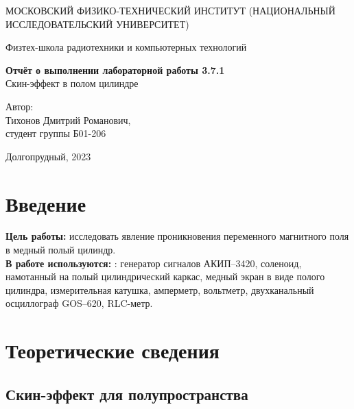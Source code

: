 \documentclass[a4paper, 12pt]{article}
\begin{document}
    \begin{titlepage}
	\begin{center}
            {\large МОСКОВСКИЙ ФИЗИКО-ТЕХНИЧЕСКИЙ ИНСТИТУТ (НАЦИОНАЛЬНЫЙ ИССЛЕДОВАТЕЛЬСКИЙ УНИВЕРСИТЕТ)}
	\end{center}
 
	\begin{center}
		{\large Физтех-школа радиотехники и компьютерных технологий}
	\end{center}
	
	\vspace{8cm}
	{\LARGE
		\begin{center}
                {\bf Отчёт о выполнении лабораторной работы 3.7.1}\\
                Скин-эффект в полом цилиндре
		\end{center}
	}
	\vspace{5cm}
	\begin{flushright}
		{\Large Автор:\\ Тихонов Дмитрий Романович, \\
			\vspace{0.2cm}
			студент группы Б01-206}
	\end{flushright}
	\vspace{5cm}
	\begin{center}
		\Large Долгопрудный, 2023
	\end{center}
    \end{titlepage}


    \section{Введение}

    \noindent \textbf{Цель работы:} исследовать явление проникновения переменного магнитного поля в медный полый цилиндр. \\

    \noindent \textbf{В работе используются:} : генератор сигналов АКИП–3420, соленоид, намотанный на полый цилиндрический каркас, медный экран в виде полого цилиндра, измерительная катушка, амперметр, вольтметр, двухканальный осциллограф GOS–620, RLC-метр.
    
    \section{Теоретические сведения}
    
    \subsection{Скин-эффект для полупространства}
\end{document}
